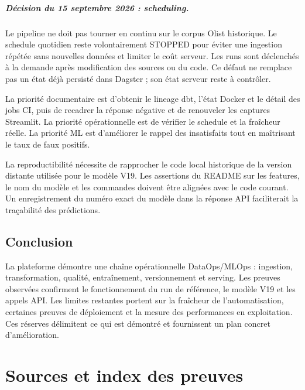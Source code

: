 \documentclass[11pt,a4paper]{report}
\begin{document}
\paragraph{Décision du 15 septembre 2026 : scheduling.}
Le pipeline ne doit pas tourner en continu sur le corpus Olist historique.
Le schedule quotidien reste volontairement STOPPED pour éviter une ingestion
répétée sans nouvelles données et limiter le coût serveur. Les runs sont déclenchés
à la demande après modification des sources ou du code. Ce défaut ne remplace
pas un état déjà persisté dans Dagster ; son état serveur reste à contrôler.

La priorité documentaire est d'obtenir le lineage dbt, l'état Docker et le détail des jobs CI, puis de recadrer la réponse négative et de renouveler les captures Streamlit. La priorité opérationnelle est de vérifier le schedule et la fraîcheur réelle. La priorité ML est d'améliorer le rappel des insatisfaits tout en maîtrisant le taux de faux positifs.

La reproductibilité nécessite de rapprocher le code local historique de la version distante utilisée pour le modèle V19. Les assertions du README sur les features, le nom du modèle et les commandes doivent être alignées avec le code courant. Un enregistrement du numéro exact du modèle dans la réponse API faciliterait la traçabilité des prédictions.

\section{Conclusion}
La plateforme démontre une chaîne opérationnelle DataOps/MLOps : ingestion, transformation, qualité, entraînement, versionnement et serving. Les preuves observées confirment le fonctionnement du run de référence, le modèle V19 et les appels API. Les limites restantes portent sur la fraîcheur de l'automatisation, certaines preuves de déploiement et la mesure des performances en exploitation. Ces réserves délimitent ce qui est démontré et fournissent un plan concret d'amélioration.

\appendix
\chapter{Sources et index des preuves}
\end{document}

